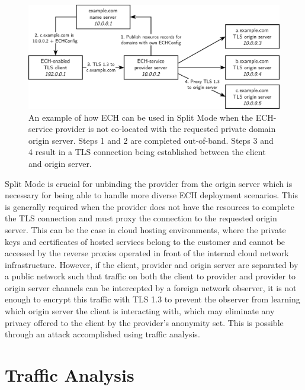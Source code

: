 \begin{figure}[ht]
\centerline{\includegraphics[width=160mm]{images/ech-split-mode.png}}
\caption[Example execution of ECH in Split Mode]{An example of how ECH can be used in Split Mode when the ECH-service provider is not co-located with the requested private domain origin server. Steps 1 and 2 are completed out-of-band. Steps 3 and 4 result in a TLS connection being established between the client and origin server.}
\label{ech_split_mode_figure}
\end{figure}

Split Mode is crucial for unbinding the provider from the origin server which is necessary for being able to handle more diverse ECH deployment scenarios. This is generally required when the provider does not have the resources to complete the TLS connection and must proxy the connection to the requested origin server. This can be the case in cloud hosting environments, where the private keys and certificates of hosted services belong to the customer and cannot be accessed by the reverse proxies operated in front of the internal cloud network infrastructure. However, if the client, provider and origin server are separated by a public network such that traffic on both the client to provider and provider to origin server channels can be intercepted by a foreign network observer, it is not enough to encrypt this traffic with TLS 1.3 to prevent the observer from learning which origin server the client is interacting with, which may eliminate any privacy offered to the client by the provider's anonymity set. This is possible through an attack accomplished using traffic analysis.







\section{Traffic Analysis}

